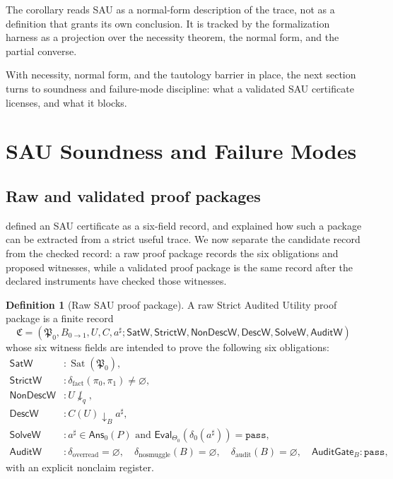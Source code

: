 \documentclass[11pt]{article}
\theoremstyle{definition}
\newtheorem{definition}[theorem]{Definition}
\begin{document}
The corollary reads SAU as a normal-form description of the trace, not as a
definition that grants its own conclusion.  It is tracked by the formalization
harness as a projection over the necessity theorem, the normal form, and the
partial converse.

With necessity, normal form, and the tautology barrier in place, the next
section turns to soundness and failure-mode discipline: what a validated SAU
certificate licenses, and what it blocks.
 \section{SAU Soundness and Failure Modes}\label{sec:soundness-failure}

\subsection{Raw and validated proof packages}
\label{subsec:soundness-raw-validated}

 defined an SAU certificate as a six-field record, and
 explained how such a package can be extracted from a
strict useful trace.  We now separate the candidate record from the checked
record: a raw proof package records the six obligations and proposed witnesses,
while a validated proof package is the same record after the declared
instruments have checked those witnesses.

\begin{definition}[Raw SAU proof package]
\label{def:sau-raw-proof-package}
A raw Strict Audited Utility proof package is a finite record
\[
\mathfrak C=(\mathfrak P_0,B_{0\to1},U,C,a^\sharp;
\mathsf{SatW},\mathsf{StrictW},\mathsf{NonDescW},\mathsf{DescW},\mathsf{SolveW},\mathsf{AuditW})
\]
whose six witness fields are intended to prove the following six obligations:
\begin{align*}
\mathsf{SatW}&:\operatorname{Sat}(\mathfrak P_0),\\
\mathsf{StrictW}&:\delta_{\mathrm{fact}}(\pi_0,\pi_1)\neq\varnothing,\\
\mathsf{NonDescW}&:U\not\downarrow_q,\\
\mathsf{DescW}&:C(U)\downarrow_B a^\sharp,\\
\mathsf{SolveW}&:a^\sharp\in\mathsf{Ans}_0(P)
\text{ and }\mathsf{Eval}_{\Theta_0}(\delta_0(a^\sharp))=\texttt{pass},\\
\mathsf{AuditW}&:\delta_{\mathrm{overread}}=\varnothing,
\quad\delta_{\mathrm{nosmuggle}}(B)=\varnothing,
\quad\delta_{\mathrm{audit}}(B)=\varnothing,
\quad\mathsf{AuditGate}_B:\texttt{pass},
\end{align*}
with an explicit nonclaim register.
\end{definition}
\end{document}
